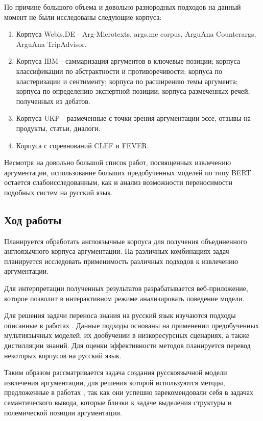 По причине большого объема и довольно разнородных подходов на данный момент не были исследованы следующие корпуса:
\begin{enumerate}
    \item Корпуса Webis.DE - Arg-Microtexts, args.me corpus, ArguAna Counterargs, ArguAna TripAdvisor.
    \item Корпуса IBM - саммаризация аргументов в ключевые позиции; корпуса классификации по абстрактности и противоречивости; корпуса по кластеризации и сентименту; корпуса по расширению темы аргумента; корпуса по определению экспертной позиции; корпуса размеченных речей, полученных из дебатов.
    \item Корпуса UKP - размеченные с точки зрения аргументации эссе, отзывы на продукты, статьи, диалоги.
    \item Корпуса с соревнований CLEF и FEVER.
\end{enumerate}


Несмотря на довольно большой список работ, посвященных извлечению аргументации, использование больших предобученных моделей по типу BERT \cite{devlin2018bert} остается слабоисследованным, как и анализ возможности переносимости подобных систем на русский язык.

\subsection{Ход работы}

Планируется обработать англоязычные корпуса для получения объединенного англоязычного корпуса аргументации. На различных комбинациях задач планируется исследовать применимость различных подходов к извлечению аргументации.

Для интерпретации полученных результатов разрабатывается веб-приложение, которое позволит в интерактивном режиме анализировать поведение модели.

Для решения задачи переноса знания на русский язык изучаются подходы описанные в работах \cite{conneau2018xnli, nooralahzadeh2020zero, schuster-etal-2019-cross-lingual}. Данные подходы основаны на применении предобученных мультиязычных моделей, их дообучении в низкоресурсных сценариях, а также дистилляции знаний. Для оценки эффективности методов планируется перевод некоторых корпусов на русский язык.

Таким образом рассматривается задача создания русскоязычной модели извлечения аргументации, для решения которой используются методы, предложенные в работах \cite{nooralahzadeh2020zero, schuster-etal-2019-cross-lingual}, так как они успешно зарекомендовали себя в задачах семантического вывода, которые близки к задаче выделения структуры и полемической позиции аргументации.
